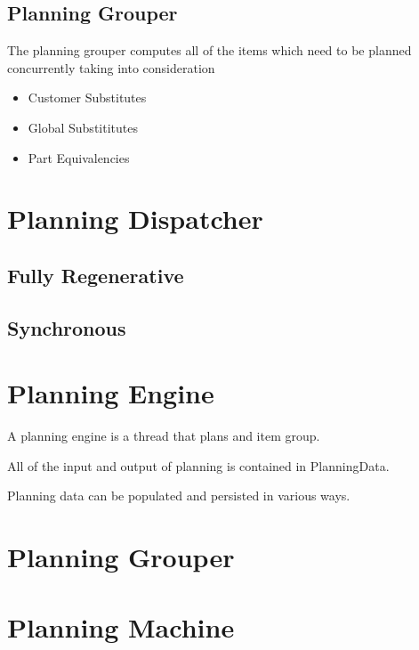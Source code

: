 \documentclass[letterpaper,10pt,english]{sphinxmanual}
\begin{document}
\section{Planning Grouper}
\label{APS/PlanningComponentsPaper:planning-grouper}
The planning grouper computes all of the items which need to be planned
concurrently taking into consideration
\begin{itemize}
\item {} 
Customer Substitutes

\item {} 
Global Substititutes

\item {} 
Part Equivalencies

\end{itemize}


\chapter{Planning Dispatcher}
\label{APS/PlanningDispatcher:planning-dispatcher}\label{APS/PlanningDispatcher::doc}

\section{Fully Regenerative}
\label{APS/PlanningDispatcher:fully-regenerative}

\section{Synchronous}
\label{APS/PlanningDispatcher:synchronous}

\chapter{Planning Engine}
\label{APS/PlanningEngine::doc}\label{APS/PlanningEngine:planning-engine}
A planning engine is a thread that plans and item group.

All of the input and output of planning is contained in PlanningData.

Planning data can be populated and persisted in various ways.


\chapter{Planning Grouper}
\label{APS/PlanningGrouper:planning-grouper}\label{APS/PlanningGrouper::doc}

\chapter{Planning Machine}
\label{APS/PlanningMachine:planning-machine}\label{APS/PlanningMachine::doc}
\end{document}
